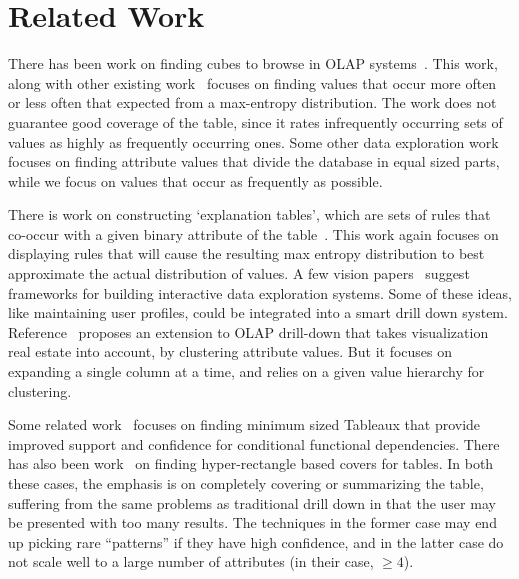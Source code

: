 
\section{Related Work}\label{sec:related}

There has been work on finding cubes to browse in OLAP systems~\cite{Sarawagi:2001:UMA:767141.767148, Sarawagi00user-adaptiveexploration, Sarawagi98discovery-drivenexploration}. This work, along with other existing work~\cite{Mampaey:2011:TMI:2020408.2020499} focuses on finding values that occur more often or less often that expected from a max-entropy distribution. The work does not guarantee good coverage of the table, since it rates infrequently occurring sets of values as highly as frequently occurring ones. Some other data exploration work~\cite{sellam:meet} focuses on finding attribute values that divide the database in equal sized parts, while we focus on values that occur as frequently as possible. 

There is work on constructing `explanation tables', which are sets of rules that co-occur with a given binary attribute of the table~\cite{DBLP:journals/pvldb/GebalyAGKS14}. This work again focuses on displaying rules that will cause the resulting max entropy distribution to best approximate the actual distribution of values. A few vision papers~\cite{data-deluge, cetintemel2013query} suggest frameworks for building interactive data exploration systems. Some of these ideas, like maintaining user profiles, could be integrated into a smart drill down system. Reference~\cite{DBLP:conf/edbt/CandanCQS09} proposes an extension to OLAP drill-down that takes visualization real estate into account, by clustering attribute values. But it focuses on expanding a single column at a time, and relies on a given value hierarchy for clustering.

Some related work~\cite{DBLP:journals/debu/GolabKS11, Golab:2008:GNT:1453856.1453900} focuses on finding minimum sized Tableaux that provide improved support and confidence for conditional functional dependencies. There has also been work~\cite{Bu:2005:MSH:1083592.1083644, Lakshmanan:2002:GMA:1287369.1287435, DBLP:conf:kdd:XiangJFD08, Geerts04tilingdatabases} on finding hyper-rectangle based covers for tables. In both these cases, the emphasis is on completely covering or 
summarizing the table, suffering from the same problems as traditional drill down in that the user may be presented with
too many results. The techniques in the former case may end up picking rare ``patterns'' if they have high confidence, and in the latter case do not scale well to a large number of attributes (in their case, $\geq 4$). 

